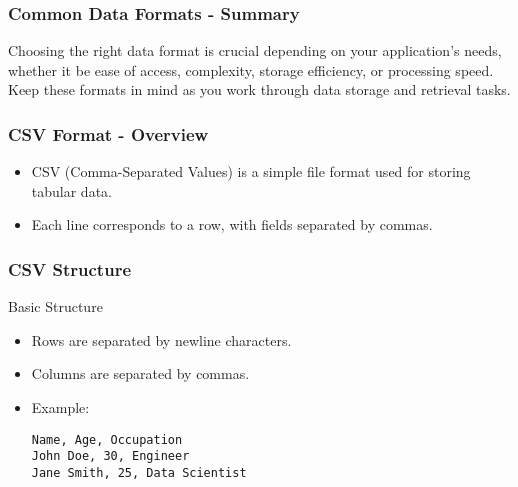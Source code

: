 \documentclass[aspectratio=169]{beamer}
\begin{document}
\begin{frame}
    \frametitle{Common Data Formats - Summary}
    Choosing the right data format is crucial depending on your application’s needs, whether it be ease of access, complexity, storage efficiency, or processing speed. Keep these formats in mind as you work through data storage and retrieval tasks.
\end{frame}

\begin{frame}[fragile]
    \frametitle{CSV Format - Overview}
    \begin{itemize}
        \item CSV (Comma-Separated Values) is a simple file format used for storing tabular data.
        \item Each line corresponds to a row, with fields separated by commas.
    \end{itemize}
\end{frame}

\begin{frame}[fragile]
    \frametitle{CSV Structure}
    \begin{block}{Basic Structure}
        \begin{itemize}
            \item Rows are separated by newline characters.
            \item Columns are separated by commas.
            \item Example:
            \begin{lstlisting}
Name, Age, Occupation
John Doe, 30, Engineer
Jane Smith, 25, Data Scientist
            \end{lstlisting}
        \end{itemize}
    \end{block}
\end{frame}
\end{document}
